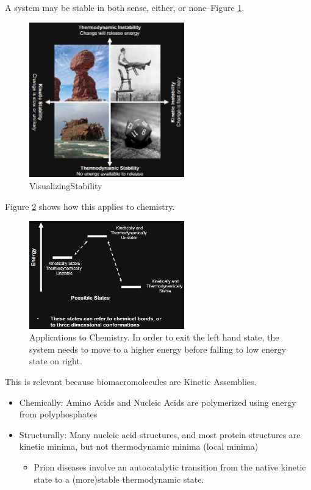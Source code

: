 \documentclass[]{article}
\begin{document}
A system may be stable in both sense, either, or none--Figure \ref{fig:VisualizingStability}.
\begin{figure}[H]
	\begin{center}
		\caption{VisualizingStability}\label{fig:VisualizingStability}
		\includegraphics[width=0.6\textwidth]{VisualizingStability}
	\end{center}
\end{figure}

Figure \ref{fig:ApplicationsToChemistry} shows how this applies to chemistry.

\begin{figure}[H]
	\begin{center}
		\caption[Applications to Chemistry]{Applications to Chemistry. In order to exit the left hand state, the system needs to move to a higher energy before falling to low energy state on right.}\label{fig:ApplicationsToChemistry}
		\includegraphics[width=0.6\textwidth]{ApplicationsToChemistry}
	\end{center}
\end{figure}
This is relevant because biomacromolecules are Kinetic Assemblies.
\begin{itemize}
	\item Chemically: Amino Acids and Nucleic Acids are polymerized using energy from polyphosphates
	\item Structurally: Many nucleic acid structures, and most 	protein structures are kinetic minima, but not thermodynamic minima (local minima)
	\begin{itemize}
		\item  Prion diseases involve an autocatalytic transition from the native kinetic state to a (more)stable thermodynamic state.
	\end{itemize}
\end{itemize}
\end{document}
